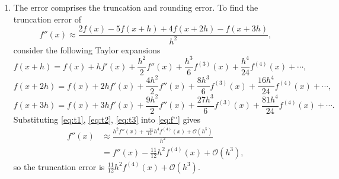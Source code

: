 \documentclass[a4paper,11pt]{article}
\begin{document}
\begin{enumerate}
\begin{enumerate}
		\item The error comprises the truncation and rounding error. To 
		find the truncation error of 
		\begin{equation}
			f''(x) \approx \frac{2f(x)-5f(x+h)+4f(x+2h)-f(x+3h)}{h^{2}},
			\label{eq:f''}
		\end{equation}
		consider the following Taylor expansions
		\begin{equation}
			f(x + h) = f(x) + hf'(x) + \frac{h^{2}}{2}f''(x) + 
			\frac{h^{3}}{6}f^{(3)}(x) + \frac{h^{4}}{24}f^{(4)}(x) + \cdots,
			\label{eq:t1}
		\end{equation}
		\begin{equation}
			f(x + 2h) = f(x) + 2hf'(x) + \frac{4h^{2}}{2}f''(x) + 
			\frac{8h^{3}}{6}f^{(3)}(x) + \frac{16h^{4}}{24}f^{(4)}(x) + 
			\cdots,
			\label{eq:t2}
		\end{equation}
		\begin{equation}
			f(x + 3h) = f(x) + 3hf'(x) + \frac{9h^{2}}{2}f''(x) + 
			\frac{27h^{3}}{6}f^{(3)}(x) + \frac{81h^{4}}{24}f^{(4)}(x) + 
			\cdots.
			\label{eq:t3}
		\end{equation}
		Substituting \eqref{eq:t1}, \eqref{eq:t2}, \eqref{eq:t3} into 
		\eqref{eq:f''} gives
		\begin{align}
			f''(x) &\approx \frac{h^{2}f''(x) + 
			\frac{-11}{12}h^{4}f^{(4)}(x) + \mathcal{O}(h^{5})}{h^{2}}\\
			&= f''(x) - \frac{11}{12}h^{2}f^{(4)}(x) + 
			\mathcal{O}(h^{3}),
		\end{align}
		so the truncation error is $\frac{11}{12}h^{2}f^{(4)}(x) + 
		\mathcal{O}(h^{3})$.
		

\end{enumerate}
\end{enumerate}
\end{document}
